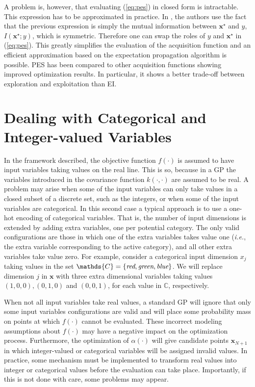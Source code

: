 A problem is, however, that evaluating (\ref{eq:pes}) in closed form is intractable. This expression has
to be approximated in practice. In \cite{hernandez2014predictive}, the authors use the fact that the previous expression
is simply the mutual information between $\mathbf{x}^\star$ and $y$, $I(\mathbf{x}^\star;y)$, which is symmetric. 
Therefore one can swap the roles of $y$ and $\mathbf{x}^\star$ in (\ref{eq:pes}). This greatly simplifies the evaluation of the 
acquisition function and an efficient approximation based on the expectation propagation algorithm is possible. PES has been
compared to other acquisition functions showing improved optimization results. In particular, it shows a better
trade-off between exploration and exploitation than EI.

\section{Dealing with Categorical and Integer-valued Variables} \label{sec:dealing}

In the framework described, the objective function $f(\cdot)$ 
is assumed to have input variables taking values on the real line. This is so, because in a GP the variables 
introduced in the covariance function $k(\cdot,\cdot)$ are assumed to be real. A problem 
may arise when some of the input variables can only take values in a closed subset of a discrete set, such as the 
integers, or when some of the input variables are categorical. In this second case a typical approach
is to use a one-hot encoding of categorical variables. That is, the number of input dimensions is extended
by adding extra variables, one per potential category. The only valid configurations are those in which 
one of the extra variables takes value one (\emph{i.e.}, the extra variable corresponding to the active category), 
and all other extra variables take value zero.  For example, consider a categorical input dimension 
$x_j$ taking values in the set $\mathds{C}=\{\emph{red}, \emph{green}, \emph{blue}\}$.
We will replace dimension $j$ in $\mathbf{x}$ with three extra dimensional variables taking 
values $(1,0,0), (0, 1, 0)$ and $(0,0,1)$, for each value in $\mathds{C}$, respectively.

When not all input variables take real values, a standard GP will ignore that only some input variables configurations 
are valid and will place some probability mass on points at which $f(\cdot)$ cannot be evaluated. These incorrect 
modeling assumptions about $f(\cdot)$ may have a negative impact on the optimization process. 
Furthermore, the optimization of $\alpha(\cdot)$ will give candidate points $\mathbf{x}_{N+1}$
in which integer-valued or categorical variables will be assigned invalid values. In practice, some mechanism must 
be implemented to transform real values into integer or categorical values before the evaluation can take place. 
Importantly, if this is not done with care, some problems may appear.

